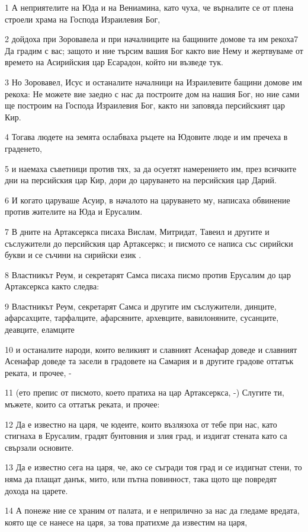 \par 1 А неприятелите на Юда и на Вениамина, като чуха, че върналите се от плена строели храма на Господа Израилевия Бог,
\par 2 дойдоха при Зоровавела и при началниците на бащините домове та им рекоха7 Да градим с вас; защото и ние търсим вашия Бог както вие Нему и жертвуваме от времето на Асирийския цар Есарадон, който ни възведе тук.
\par 3 Но Зоровавел, Исус и останалите началници на Израилевите бащини домове им рекоха: Не можете вие заедно с нас да построите дом на нашия Бог, но ние сами ще построим на Господа Израилевия Бог, както ни заповяда персийският цар Кир.
\par 4 Тогава людете на земята ослабваха ръцете на Юдовите люде и им пречеха в граденето,
\par 5 и наемаха съветници против тях, за да осуетят намерението им, през всичките дни на персийския цар Кир, дори до царуването на персийския цар Дарий.
\par 6 И когато царуваше Асуир, в началото на царуването му, написаха обвинение против жителите на Юда и Ерусалим.
\par 7 В дните на Артаксеркса писаха Вислам, Митридат, Тавеил и другите и съслужители до персийския цар Артаксеркс; и писмото се написа със сирийски букви и се съчини на сирийски език .
\par 8 Властникът Реум, и секретарят Самса писаха писмо против Ерусалим до цар Артаксеркса както следва:
\par 9 Властникът Реум, секретарят Самса и другите им съслужители, динците, афарсахците, тарфалците, афарсяните, архевците, вавилоняните, сусанците, деавците, еламците
\par 10 и останалите народи, които великият и славният Асенафар доведе и славният Асенафар доведе та засели в градовете на Самария и в другите градове оттатък реката, и прочее, -
\par 11 (ето препис от писмото, което пратиха на цар Артаксеркса, -) Слугите ти, мъжете, които са оттатък реката, и прочее:
\par 12 Да е известно на царя, че юдеите, които възлязоха от тебе при нас, като стигнаха в Ерусалим, градят бунтовния и злия град, и издигат стената като са свързали основите.
\par 13 Да е известно сега на царя, че, ако се съгради тоя град и се издигнат стени, то няма да плащат данък, мито, или пътна повинност, така щото ще повредят дохода на царете.
\par 14 А понеже ние се храним от палата, и е неприлично за нас да гледаме вредата, която ще се нанесе на царя, за това пратихме да известим на царя,
